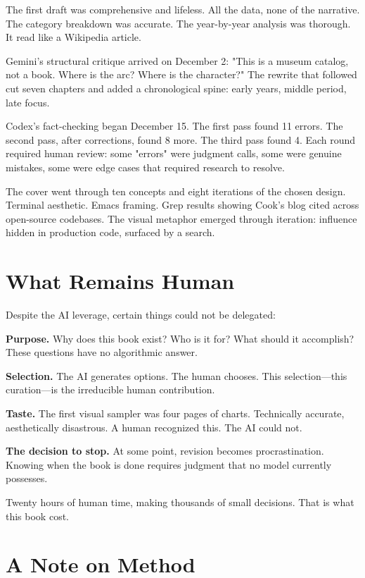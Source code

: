 The first draft was comprehensive and lifeless. All the data, none of the narrative. The category breakdown was accurate. The year-by-year analysis was thorough. It read like a Wikipedia article.

Gemini's structural critique arrived on December 2: "This is a museum catalog, not a book. Where is the arc? Where is the character?" The rewrite that followed cut seven chapters and added a chronological spine: early years, middle period, late focus.

Codex's fact-checking began December 15. The first pass found 11 errors. The second pass, after corrections, found 8 more. The third pass found 4. Each round required human review: some "errors" were judgment calls, some were genuine mistakes, some were edge cases that required research to resolve.

The cover went through ten concepts and eight iterations of the chosen design. Terminal aesthetic. Emacs framing. Grep results showing Cook's blog cited across open-source codebases. The visual metaphor emerged through iteration: influence hidden in production code, surfaced by a search.

\bigskip

\section*{What Remains Human}

Despite the AI leverage, certain things could not be delegated:

\textbf{Purpose.} Why does this book exist? Who is it for? What should it accomplish? These questions have no algorithmic answer.

\textbf{Selection.} The AI generates options. The human chooses. This selection—this curation—is the irreducible human contribution.

\textbf{Taste.} The first visual sampler was four pages of charts. Technically accurate, aesthetically disastrous. A human recognized this. The AI could not.

\textbf{The decision to stop.} At some point, revision becomes procrastination. Knowing when the book is done requires judgment that no model currently possesses.

Twenty hours of human time, making thousands of small decisions. That is what this book cost.

\bigskip

\section*{A Note on Method}

